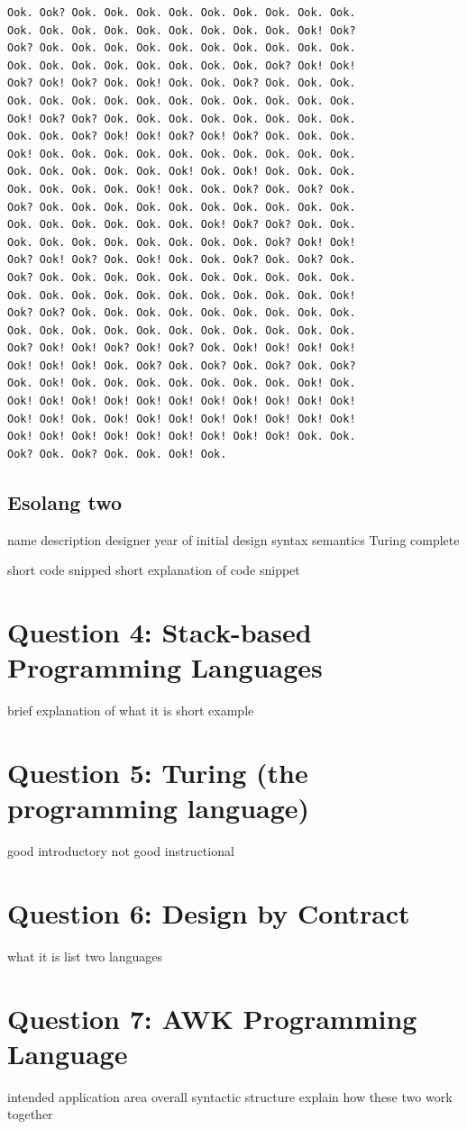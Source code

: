 \documentclass[a4paper]{article}
\begin{document}
	\begin{lstlisting}
Ook. Ook? Ook. Ook. Ook. Ook. Ook. Ook. Ook. Ook. Ook. 
Ook. Ook. Ook. Ook. Ook. Ook. Ook. Ook. Ook. Ook! Ook?
Ook? Ook. Ook. Ook. Ook. Ook. Ook. Ook. Ook. Ook. Ook. 
Ook. Ook. Ook. Ook. Ook. Ook. Ook. Ook. Ook? Ook! Ook! 
Ook? Ook! Ook? Ook. Ook! Ook. Ook. Ook? Ook. Ook. Ook. 
Ook. Ook. Ook. Ook. Ook. Ook. Ook. Ook. Ook. Ook. Ook. 
Ook! Ook? Ook? Ook. Ook. Ook. Ook. Ook. Ook. Ook. Ook. 
Ook. Ook. Ook? Ook! Ook! Ook? Ook! Ook? Ook. Ook. Ook. 
Ook! Ook. Ook. Ook. Ook. Ook. Ook. Ook. Ook. Ook. Ook. 
Ook. Ook. Ook. Ook. Ook. Ook! Ook. Ook! Ook. Ook. Ook. 
Ook. Ook. Ook. Ook. Ook! Ook. Ook. Ook? Ook. Ook? Ook. 
Ook? Ook. Ook. Ook. Ook. Ook. Ook. Ook. Ook. Ook. Ook. 
Ook. Ook. Ook. Ook. Ook. Ook. Ook! Ook? Ook? Ook. Ook. 
Ook. Ook. Ook. Ook. Ook. Ook. Ook. Ook. Ook? Ook! Ook! 
Ook? Ook! Ook? Ook. Ook! Ook. Ook. Ook? Ook. Ook? Ook. 
Ook? Ook. Ook. Ook. Ook. Ook. Ook. Ook. Ook. Ook. Ook.
Ook. Ook. Ook. Ook. Ook. Ook. Ook. Ook. Ook. Ook. Ook! 
Ook? Ook? Ook. Ook. Ook. Ook. Ook. Ook. Ook. Ook. Ook. 
Ook. Ook. Ook. Ook. Ook. Ook. Ook. Ook. Ook. Ook. Ook. 
Ook? Ook! Ook! Ook? Ook! Ook? Ook. Ook! Ook! Ook! Ook! 
Ook! Ook! Ook! Ook. Ook? Ook. Ook? Ook. Ook? Ook. Ook? 
Ook. Ook! Ook. Ook. Ook. Ook. Ook. Ook. Ook. Ook! Ook. 
Ook! Ook! Ook! Ook! Ook! Ook! Ook! Ook! Ook! Ook! Ook! 
Ook! Ook! Ook. Ook! Ook! Ook! Ook! Ook! Ook! Ook! Ook! 
Ook! Ook! Ook! Ook! Ook! Ook! Ook! Ook! Ook! Ook. Ook. 
Ook? Ook. Ook? Ook. Ook. Ook! Ook. 
	\end{lstlisting}
	\subsection{Esolang two}
	name
	description
		designer
		year of initial design
		syntax
		semantics
		Turing complete
		
	short code snipped
	short explanation of code snippet
\section{Question 4: Stack-based Programming Languages}
	brief explanation of what it is
	short example
\section{Question 5: Turing (the programming language)}
	good introductory
	not good instructional
\section{Question 6: Design by Contract}
	what it is
	list two languages
\section{Question 7: AWK Programming Language}
	intended application area
	overall syntactic structure
	explain how these two work together

{}

	
\end{document}
